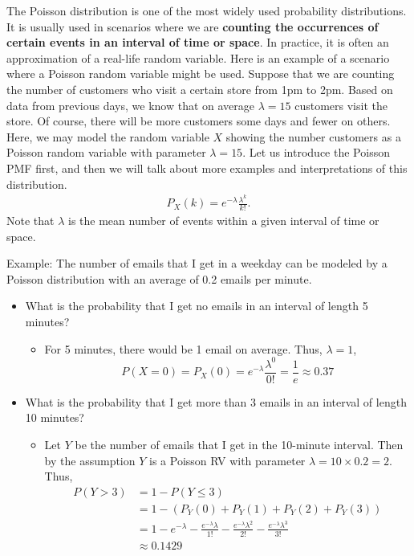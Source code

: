 The Poisson distribution is one of the most widely used probability distributions. It is usually used in scenarios where we are \textbf{counting the occurrences of certain events in an interval of time or space}. In practice, it is often an approximation of a real-life random variable. Here is an example of a scenario where a Poisson random variable might be used. Suppose that we are counting the number of customers who visit a certain store from 1pm to 2pm. Based on data from previous days, we know that on average $\lambda=15$ customers visit the store. Of course, there will be more customers some days and fewer on others. Here, we may model the random variable $X$ showing the number customers as a Poisson random variable with parameter $\lambda=15$. Let us introduce the Poisson PMF first, and then we will talk about more examples and interpretations of this distribution.
\begin{align*}
	P_X(k) = e^{-\lambda}\frac{\lambda^{k}}{k!}.
\end{align*}
Note that $\lambda$ is the mean number of events within a given interval of time or space. 

Example: The number of emails that I get in a weekday can be modeled by a Poisson distribution with an average of 0.2 emails per minute. 
\begin{itemize}
	\item What is the probability that I get no emails in an interval of length 5 minutes?
		\begin{itemize}
			\item For 5 minutes, there would be 1 email on average. Thus, $\lambda=1$, 
				$$P(X=0) = P_X(0) = e^{-\lambda}\frac{\lambda^{0}}{0!} = \frac{1}{e}\approx 0.37$$
		\end{itemize}
	\item What is the probability that I get more than 3 emails in an interval of length 10 minutes?
		\begin{itemize}
			\item Let $Y$ be the number of emails that I get in the 10-minute interval. Then by the assumption $Y$ is a Poisson RV with parameter $\lambda = 10\times 0.2 = 2$. Thus,
				\begin{align*}
					P(Y>3) &= 1-P(Y\leq 3)\\
						   &= 1-(P_Y(0)+P_Y(1)+P_Y(2)+P_Y(3))\\
						   &= 1-e^{-\lambda}-\frac{e^{-\lambda} \lambda}{1!}-\frac{e^{-\lambda} \lambda^2}{2!}-\frac{e^{-\lambda} \lambda^3}{3!}\\
						   &\approx 0.1429
				\end{align*}
		\end{itemize}
\end{itemize}

